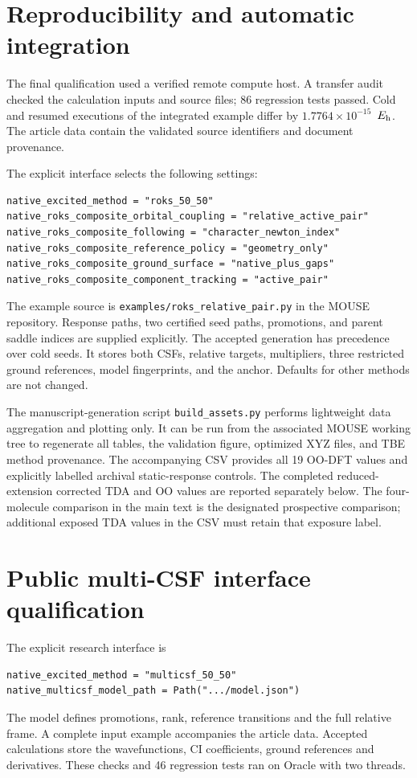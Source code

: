 \documentclass[11pt,a4paper]{article}
\newcommand{\Eh}{\ensuremath{E_{\rm h}}}
\begin{document}
\section{Reproducibility and automatic integration}
The final qualification used a verified remote compute host. A transfer audit
checked the calculation inputs and source files; 86 regression tests passed.
Cold and resumed executions of the integrated example differ by
$1.7764\times10^{-15}$~\Eh. The article data contain the validated source
identifiers and document provenance.

The explicit interface selects the following settings:
\begin{Verbatim}[fontsize=\small]
native_excited_method = "roks_50_50"
native_roks_composite_orbital_coupling = "relative_active_pair"
native_roks_composite_following = "character_newton_index"
native_roks_composite_reference_policy = "geometry_only"
native_roks_composite_ground_surface = "native_plus_gaps"
native_roks_composite_component_tracking = "active_pair"
\end{Verbatim}
The example source is \texttt{examples/roks\_relative\_pair.py} in the MOUSE repository. Response paths, two certified seed paths, promotions, and parent saddle indices are supplied explicitly. The accepted generation has precedence over cold seeds. It stores both CSFs, relative targets, multipliers, three restricted ground references, model fingerprints, and the anchor. Defaults for other methods are not changed.

The manuscript-generation script \texttt{build\_assets.py} performs lightweight data aggregation and plotting only. It can be run from the associated MOUSE working tree to regenerate all tables, the validation figure, optimized XYZ files, and TBE method provenance. The accompanying CSV provides all 19 OO-DFT values and explicitly labelled archival static-response controls. The completed reduced-extension corrected TDA and OO values are reported separately below. The four-molecule comparison in the main text is the designated prospective comparison; additional exposed TDA values in the CSV must retain that exposure label.

\section{Public multi-CSF interface qualification}
The explicit research interface is
\begin{Verbatim}[fontsize=\small]
native_excited_method = "multicsf_50_50"
native_multicsf_model_path = Path(".../model.json")
\end{Verbatim}
The model defines promotions, rank, reference transitions and the full relative frame. A complete input example accompanies the article data. Accepted calculations store the wavefunctions, CI coefficients, ground references and derivatives. These checks and 46 regression tests ran on Oracle with two threads.
\end{document}

